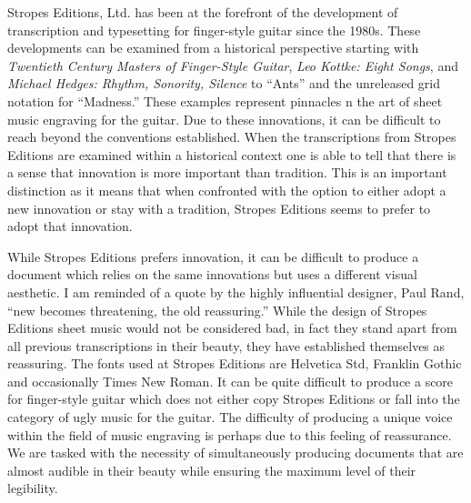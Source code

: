 \documentclass[unicode,hyperfootnotes=false,xetex,colorlinks=true,nofonts,nobib]{tufte-handout}
\newcommand{\textls}[2][5]{%
    \begingroup\addfontfeatures{LetterSpace=#1}#2\endgroup
  }
\renewcommand{\smallcapsspacing}[1]{\textls[10]{#1}}
\renewcommand{\textsc}[1]{\smallcapsspacing{\textsmallcaps{#1}}}
\begin{document}
Stropes Editions, Ltd. has been at the forefront of the development of transcription and typesetting for finger-style guitar since the 1980s. These developments can be examined from a historical perspective starting with \emph{Twentieth Century Masters of Finger-Style Guitar}, \emph{Leo Kottke: Eight Songs}, and \emph{Michael Hedges: Rhythm, Sonority, Silence} to ``Ants'' and the unreleased grid notation for ``Madness.'' These examples represent pinnacles n the art of sheet music engraving for the guitar.  Due to these innovations, it can be difficult to reach beyond the conventions established. When the transcriptions from Stropes Editions are examined within a historical context one is able to tell that there is a sense that innovation is more important than tradition. This is an important distinction as it means that when confronted with the option to either adopt a new innovation or stay with a tradition, Stropes Editions seems to prefer to adopt that innovation. 

  While Stropes Editions prefers innovation, it can be difficult to produce a document which relies on the same innovations but uses a different visual aesthetic. I am reminded of a quote by the highly influential designer, Paul Rand, ``new becomes threatening, the old reassuring.'' While the design of Stropes Editions sheet music would not be considered bad, in fact they stand apart from all previous transcriptions in their beauty, they have established themselves as reassuring. The fonts used at Stropes Editions are Helvetica \textsc{lt} Std, \textsc{itc} Franklin Gothic and occasionally Times New Roman. It can be quite difficult to produce a score for finger-style guitar which does not either copy Stropes Editions or fall into the category of ugly music for the guitar. The difficulty of producing a unique voice within the field of music engraving is perhaps due to this feeling of reassurance. We are tasked with the necessity of simultaneously producing documents that are almost audible in their beauty while ensuring the maximum level of their legibility. 
  
\end{document}
